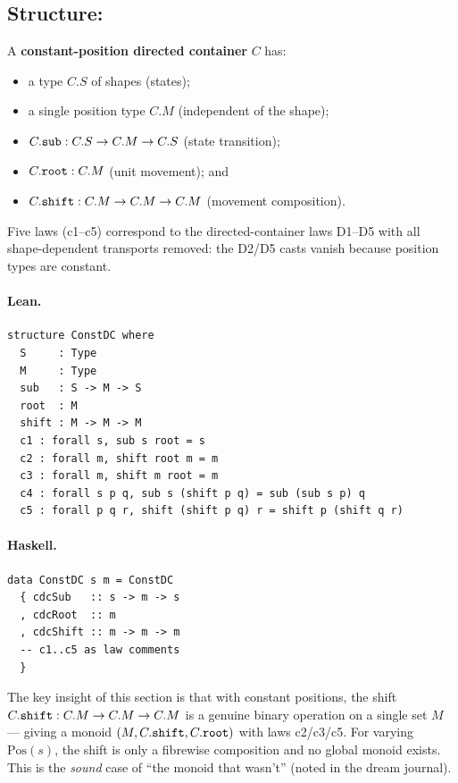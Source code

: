 \documentclass[11pt,a4paper]{article}
\begin{document}
\subsection{Structure: }

\begin{defn}
A \textbf{constant-position directed container} $C$ has:
\begin{itemize}
  \item a type $C.S$ of shapes (states);
  \item a single position type $C.M$ (independent of the shape);
  \item $C.\texttt{sub} : C.S \to C.M \to C.S$ (state transition);
  \item $C.\texttt{root} : C.M$ (unit movement); and
  \item $C.\texttt{shift} : C.M \to C.M \to C.M$ (movement composition).
\end{itemize}
Five laws (c1--c5) correspond to the directed-container laws D1--D5 with all
shape-dependent transports removed: the D2/D5 casts vanish because position
types are constant.
\end{defn}

\paragraph{Lean.}
\begin{lstlisting}[style=lean]
structure ConstDC where
  S     : Type
  M     : Type
  sub   : S -> M -> S
  root  : M
  shift : M -> M -> M
  c1 : forall s, sub s root = s
  c2 : forall m, shift root m = m
  c3 : forall m, shift m root = m
  c4 : forall s p q, sub s (shift p q) = sub (sub s p) q
  c5 : forall p q r, shift (shift p q) r = shift p (shift q r)
\end{lstlisting}

\paragraph{Haskell.}
\begin{lstlisting}[style=haskell]
data ConstDC s m = ConstDC
  { cdcSub   :: s -> m -> s
  , cdcRoot  :: m
  , cdcShift :: m -> m -> m
  -- c1..c5 as law comments
  }
\end{lstlisting}

\begin{fidelitynote}
The key insight of this section is that with constant positions, the shift
$C.\texttt{shift} : C.M \to C.M \to C.M$ is a genuine binary operation on a
single set $M$ --- giving a monoid $(M, C.\texttt{shift}, C.\texttt{root})$ with
laws c2/c3/c5.  For varying $\mathrm{Pos}(s)$, the shift is only a fibrewise
composition and no global monoid exists.  This is the \emph{sound} case of
``the monoid that wasn't'' (noted in the dream journal).
\end{fidelitynote}
\end{document}
